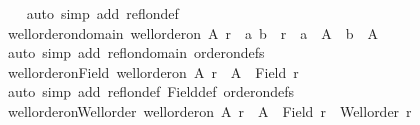 \begin{isabellebody}
%
\isadelimproof
\ \ %
\endisadelimproof
%
\isatagproof
{}\isamarkupfalse%
\ {\isacharparenleft}{\kern0pt}auto\ simp\ add{\isacharcolon}{\kern0pt}\ refl{\isacharunderscore}{\kern0pt}on{\isacharunderscore}{\kern0pt}def{\isacharparenright}{\kern0pt}%
\endisatagproof
{\isafoldproof}%
%
\isadelimproof
\isanewline
%
\endisadelimproof
\isanewline
{}\isamarkupfalse%
\ well{\isacharunderscore}{\kern0pt}order{\isacharunderscore}{\kern0pt}on{\isacharunderscore}{\kern0pt}domain{\isacharcolon}{\kern0pt}\ {\isachardoublequoteopen}well{\isacharunderscore}{\kern0pt}order{\isacharunderscore}{\kern0pt}on\ A\ r\ {\isasymLongrightarrow}\ {\isacharparenleft}{\kern0pt}a{\isacharcomma}{\kern0pt}\ b{\isacharparenright}{\kern0pt}\ {\isasymin}\ r\ {\isasymLongrightarrow}\ a\ {\isasymin}\ A\ {\isasymand}\ b\ {\isasymin}\ A{\isachardoublequoteclose}\isanewline
%
\isadelimproof
\ \ %
\endisadelimproof
%
\isatagproof
{}\isamarkupfalse%
\ {\isacharparenleft}{\kern0pt}auto\ simp\ add{\isacharcolon}{\kern0pt}\ refl{\isacharunderscore}{\kern0pt}on{\isacharunderscore}{\kern0pt}domain\ order{\isacharunderscore}{\kern0pt}on{\isacharunderscore}{\kern0pt}defs{\isacharparenright}{\kern0pt}%
\endisatagproof
{\isafoldproof}%
%
\isadelimproof
\isanewline
%
\endisadelimproof
\isanewline
{}\isamarkupfalse%
\ well{\isacharunderscore}{\kern0pt}order{\isacharunderscore}{\kern0pt}on{\isacharunderscore}{\kern0pt}Field{\isacharcolon}{\kern0pt}\ {\isachardoublequoteopen}well{\isacharunderscore}{\kern0pt}order{\isacharunderscore}{\kern0pt}on\ A\ r\ {\isasymLongrightarrow}\ A\ {\isacharequal}{\kern0pt}\ Field\ r{\isachardoublequoteclose}\isanewline
%
\isadelimproof
\ \ %
\endisadelimproof
%
\isatagproof
{}\isamarkupfalse%
\ {\isacharparenleft}{\kern0pt}auto\ simp\ add{\isacharcolon}{\kern0pt}\ refl{\isacharunderscore}{\kern0pt}on{\isacharunderscore}{\kern0pt}def\ Field{\isacharunderscore}{\kern0pt}def\ order{\isacharunderscore}{\kern0pt}on{\isacharunderscore}{\kern0pt}defs{\isacharparenright}{\kern0pt}%
\endisatagproof
{\isafoldproof}%
%
\isadelimproof
\isanewline
%
\endisadelimproof
\isanewline
{}\isamarkupfalse%
\ well{\isacharunderscore}{\kern0pt}order{\isacharunderscore}{\kern0pt}on{\isacharunderscore}{\kern0pt}Well{\isacharunderscore}{\kern0pt}order{\isacharcolon}{\kern0pt}\ {\isachardoublequoteopen}well{\isacharunderscore}{\kern0pt}order{\isacharunderscore}{\kern0pt}on\ A\ r\ {\isasymLongrightarrow}\ A\ {\isacharequal}{\kern0pt}\ Field\ r\ {\isasymand}\ Well{\isacharunderscore}{\kern0pt}order\ r{\isachardoublequoteclose}\isanewline

\end{isabellebody}
